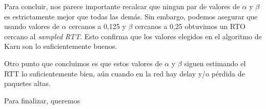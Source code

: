 Para concluir, nos parece importante recalcar que ningun par de valores de $\alpha$ y $\beta$ es estrictamente mejor que todas las demás. Sin embargo, podemos asegurar que usando valores de $\alpha$ cercanos a 0,125 y $\beta$ cercanos a 0,25 obtuvimos un RTO cercano al \emph{sampled RTT}. Esto confirma que los valores elegidos en el algoritmo de Karn son lo suficientemente buenos.

Otro punto que concluimos es que estos valores de $\alpha$ y $\beta$ siguen estimando el RTT lo suficientemente bien, aún cuando en la red hay delay y/o pérdida de paquetes altas.

Para finalizar, queremos 